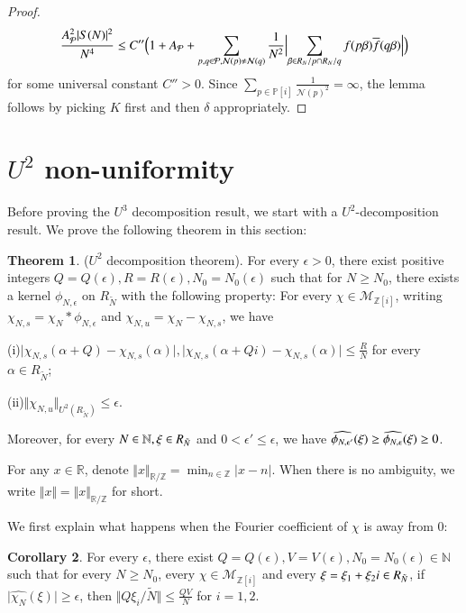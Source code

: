 \documentclass[12pt,amstex]{amsart}
\theoremstyle{definition}
\newtheorem{thm}{Theorem}[section]
\newtheorem{cor}[thm]{Corollary}
\def \Z {\mathbb{Z}[i]}
\def \P {\mathbb{P}[i]}
\def \A {\alpha}
\def \B {\beta}
\def \d {\delta}
\def \e {\epsilon}
\def \R {R_{\tilde{N}}}
\def \x {\bold{\xi}}
\begin{document}
\begin{proof}
\begin{equation}\nonumber
  \begin{split}
    \frac{A_{\mathcal{P}}^{2}\vert S(N)\vert^{2}}{N^{4}}\leq C''\Bigl(1+A_{\mathcal{P}}+\sum_{p,q\in\mathcal{P},\mathcal{N}(p)\neq \mathcal{N}(q)}\frac{1}{N^{2}}\Bigl\vert \sum_{\B\in R_{N}/p\cap R_{N}/q}f(p\B)\overline{f}(q\B)\Bigr\vert\Bigr)
  \end{split}
\end{equation}
for some universal constant $C''>0$. Since $\sum_{p\in\P}\frac{1}{\mathcal{N}(p)^{2}}=\infty$, the lemma follows by picking $K$ first and then $\d$ appropriately.
\end{proof}

\section{$U^{2}$ non-uniformity}\label{u2}

Before proving the $U^{3}$ decomposition result, we start with a $U^{2}$-decomposition result.
We prove the following theorem in this section:

\begin{thm}\label{nU2}($U^{2}$ decomposition theorem).
  For every $\e>0$, there exist positive integers $Q=Q(\e),R=R(\e),N_{0}=N_{0}(\e)$ such that for $N\geq N_{0}$, there exists a kernel $\phi_{N,\e}$ on $\R$ with the following property:
  For every $\chi\in\mathcal{M}_{\Z}$, writing $\chi_{N,s}=\chi_{N}*\phi_{N,\e}$ and $\chi_{N,u}=\chi_{N}-\chi_{N,s}$, we have

  (i)$\vert\chi_{N,s}(\A+Q)-\chi_{N,s}(\A)\vert, \vert\chi_{N,s}(\A+Qi)-\chi_{N,s}(\A)\vert\leq\frac{R}{N}$ for every $\A\in \R$;

  (ii)$\Vert\chi_{N,u}\Vert_{U^{2}(\R)}\leq\e$.

  Moreover, for every $N\in\mathbb{N}, \x\in \R$ and $0<\e'\leq\e$, we have $\widehat{\phi_{N,\e'}}(\x)\geq\widehat{\phi_{N,\e}}(\x)\geq 0$.
\end{thm}

For any $x\in\mathbb{R}$, denote $\Vert x\Vert_{\mathbb{R}/\mathbb{Z}}=\min_{n\in\mathbb{Z}}\vert x-n\vert$. When there is no ambiguity, we write $\Vert x\Vert=\Vert x\Vert_{\mathbb{R}/\mathbb{Z}}$ for short.

We first explain what happens when the Fourier coefficient of $\chi$ is away from 0:

\begin{cor}\label{nF2}
  For every $\e$, there exist $Q=Q(\e),V=V(\e), N_{0}=N_{0}(\e)\in\mathbb{N}$ such that for every $N\geq N_{0}$, every $\chi\in\mathcal{M}_{\Z}$ and every $\x=\xi_{1}+\xi_{2}i\in \R$, if $\vert\widehat{\chi_{N}}(\xi)\vert\geq\e$, then $\Vert Q\xi_{i}/\tilde{N}\Vert\leq\frac{QV}{N}$ for $i=1,2$.
\end{cor}
\end{document}
